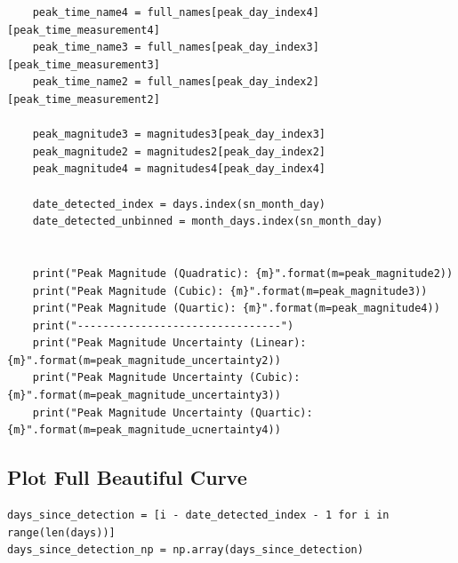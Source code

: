 \documentclass{article}
\begin{document}
\begin{appendices}
\begin{verbatim}
    peak_time_name4 = full_names[peak_day_index4][peak_time_measurement4]
    peak_time_name3 = full_names[peak_day_index3][peak_time_measurement3]
    peak_time_name2 = full_names[peak_day_index2][peak_time_measurement2]
    
    peak_magnitude3 = magnitudes3[peak_day_index3]
    peak_magnitude2 = magnitudes2[peak_day_index2]
    peak_magnitude4 = magnitudes4[peak_day_index4]
    
    date_detected_index = days.index(sn_month_day)
    date_detected_unbinned = month_days.index(sn_month_day)
    
    
    print("Peak Magnitude (Quadratic): {m}".format(m=peak_magnitude2))
    print("Peak Magnitude (Cubic): {m}".format(m=peak_magnitude3))
    print("Peak Magnitude (Quartic): {m}".format(m=peak_magnitude4))
    print("--------------------------------")
    print("Peak Magnitude Uncertainty (Linear): {m}".format(m=peak_magnitude_uncertainty2))
    print("Peak Magnitude Uncertainty (Cubic): {m}".format(m=peak_magnitude_uncertainty3))
    print("Peak Magnitude Uncertainty (Quartic): {m}".format(m=peak_magnitude_ucnertainty4))
\end{verbatim}

\subsection{Plot Full Beautiful Curve}
\begin{verbatim}
days_since_detection = [i - date_detected_index - 1 for i in range(len(days))]
days_since_detection_np = np.array(days_since_detection)


\end{verbatim}
\end{appendices}
\end{document}
